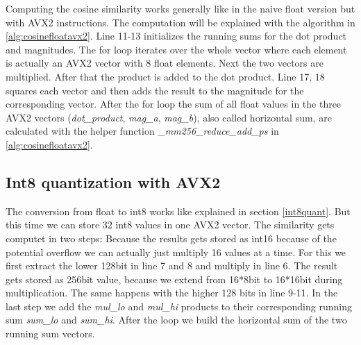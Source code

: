 Computing the cosine similarity works generally like in the naive float version but with AVX2 instructions. The computation will be explained with the algorithm in \autoref{alg:cosinefloatavx2}. Line 11-13 initializes the running sums for the dot product and magnitudes. The for loop iterates over the whole vector where each element is actually an AVX2 vector with 8 float elements. Next the two vectors are multiplied. After that the product is added to the dot product. Line 17, 18 squares each vector and then adds the result to the magnitude for the corresponding vector. After the for loop the sum of all float values in the three AVX2 vectors (\textit{dot\_product}, \textit{mag\_a}, \textit{mag\_b}), also called horizontal sum, are calculated with the helper function \textit{\_mm256\_reduce\_add\_ps} in \autoref{alg:cosinefloatavx2}.

\subsection{Int8 quantization with AVX2}
\label{int8implavx2}
The conversion from float to int8 works like explained in section \autoref{int8quant}. But this time we can store 32 int8 values in one AVX2 vector. The similarity gets computet in two steps: Because the results gets stored as int16 because of the potential overflow we can actually just multiply 16 values at a time. For this we first extract the lower 128bit in line 7 and 8 and multiply in line 6. The result gets stored as 256bit value, because we extend from 16*8bit to 16*16bit during multiplication. The same happens with the higher 128 bits in line 9-11. In the last step we add the \textit{mul\_lo} and \textit{mul\_hi} products to their corresponding running sum \textit{sum\_lo} and \textit{sum\_hi}. After the loop we build the horizontal sum of the two running sum vectors.

